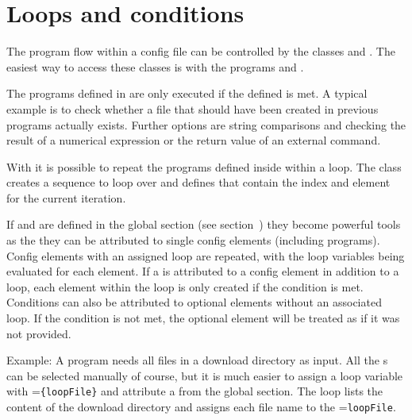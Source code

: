 \section{Loops and conditions}\label{general.loopsAndConditions}
The program flow within a config file can be controlled by the classes 
and . The easiest way to access these classes is with the programs
 and .

The programs defined in  are only executed if the defined
 is met. A typical example is to check whether a file that
should have been created in previous programs actually exists. Further options are string comparisons and
checking the result of a numerical expression or the return value of an external command.

With  it is possible to repeat the programs defined inside within a loop.
The class  creates a sequence to loop over and defines 
that contain the index and element for the current iteration.

If  and  are defined in the global
section (see section~) they become powerful tools as the
they can be attributed to single config elements (including programs).
Config elements with an assigned loop are repeated, with the loop variables being evaluated for each element.
If a  is attributed to a config element in addition to a loop, each element within the loop
is only created if the condition is met. Conditions can also be attributed to optional elements without an associated loop.
If the condition is not met, the optional element will be treated as if it was not provided.

Example: A program needs all files in a download directory as input.
All the s can be selected manually of course, but it is much easier to assign
a loop variable with =\verb|{loopFile}| and attribute a
 from the global section.
The loop lists the content of the download directory and assigns each file name to the
=\verb|loopFile|.
